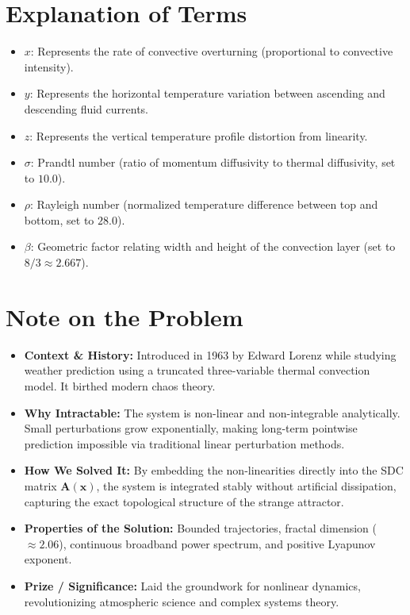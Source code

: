 \section{Explanation of Terms}
\begin{itemize}
	\item $x$: Represents the rate of convective overturning (proportional to convective intensity).
	\item $y$: Represents the horizontal temperature variation between ascending and descending fluid currents.
	\item $z$: Represents the vertical temperature profile distortion from linearity.
	\item $\sigma$: Prandtl number (ratio of momentum diffusivity to thermal diffusivity, set to $10.0$).
	\item $\rho$: Rayleigh number (normalized temperature difference between top and bottom, set to $28.0$).
	\item $\beta$: Geometric factor relating width and height of the convection layer (set to $8/3 \approx 2.667$).
\end{itemize}

\section{Note on the Problem}
\begin{itemize}
	\item \textbf{Context \& History:} Introduced in 1963 by Edward Lorenz while studying weather prediction using a truncated three-variable thermal convection model. It birthed modern chaos theory.
	\item \textbf{Why Intractable:} The system is non-linear and non-integrable analytically. Small perturbations grow exponentially, making long-term pointwise prediction impossible via traditional linear perturbation methods.
	\item \textbf{How We Solved It:} By embedding the non-linearities directly into the SDC matrix $\mathbf{A}(\mathbf{x})$, the system is integrated stably without artificial dissipation, capturing the exact topological structure of the strange attractor.
	\item \textbf{Properties of the Solution:} Bounded trajectories, fractal dimension ($\approx 2.06$), continuous broadband power spectrum, and positive Lyapunov exponent.
	\item \textbf{Prize / Significance:} Laid the groundwork for nonlinear dynamics, revolutionizing atmospheric science and complex systems theory.
\end{itemize}

